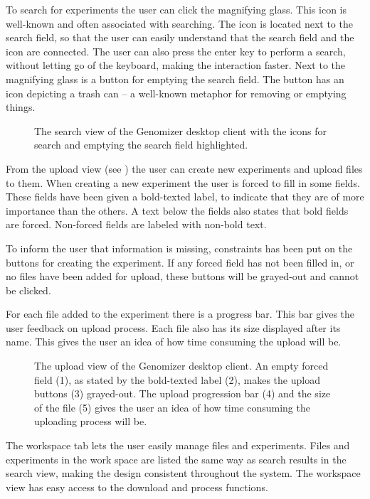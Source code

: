 To search for experiments the user can click the magnifying glass. This icon is well-known and often associated with searching. The icon is located next to the search field, so that the user can easily understand that the search field and the icon are connected. The user can also press the enter key to perform a search, without letting go of the keyboard, making the interaction faster. Next to the magnifying glass is a button for emptying the search field. The button has an icon depicting a trash can -- a well-known metaphor for removing or emptying things.

\begin{figure}[h!]
	\caption{\footnotesize The search view of the Genomizer desktop client with the icons for search and emptying the search field highlighted.}
	\label{fig:des_search_tab_interaction}
\end{figure}

From the upload view (see ) the user can create new experiments and upload files to them. When creating a new experiment the user is forced to fill in some fields. These fields have been given a bold-texted label, to indicate that they are of more importance than the others. A text below the fields also states that bold fields are forced. Non-forced fields are labeled with non-bold text.

To inform the user that information is missing, constraints has been put on the buttons for creating the experiment. If any forced field has not been filled in, or no files have been added for upload, these buttons will be grayed-out and cannot be clicked.

For each file added to the experiment there is a progress bar. This bar gives the user feedback on upload process. Each file also has  its size displayed after its name. This gives the user an idea of how time consuming the upload will be.

\begin{figure}[h!]
	\caption{\footnotesize The upload view of the Genomizer desktop client. An empty forced field (1), as stated by the bold-texted label (2), makes the upload buttons (3) grayed-out. The upload progression bar (4) and the size of the file (5) gives the user an idea of how time consuming the uploading process will be.}
	\label{fig:des_upload_view}
\end{figure}

The workspace tab lets the user easily manage files and experiments. Files and experiments in the work space are listed the same way as search results in the search view, making the design consistent throughout the system. The workspace view has easy access to the download and process functions.

